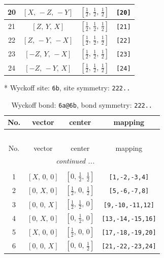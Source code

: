 \documentclass[fleqn,8pt]{jsarticle}
\begin{document}
\begin{longtable}{cccc}
20 & $\left[ X,\, - Z,\, - Y \right]$ & $\left[ \frac{1}{2},\, \frac{1}{2},\, \frac{1}{2} \right]$ & {\tt [20]} \\ \hline
21 & $\left[ Z,\, Y,\, X \right]$ & $\left[ \frac{1}{2},\, \frac{1}{2},\, \frac{1}{2} \right]$ & {\tt [21]} \\ \hline
22 & $\left[ Z,\, - Y,\, - X \right]$ & $\left[ \frac{1}{2},\, \frac{1}{2},\, \frac{1}{2} \right]$ & {\tt [22]} \\ \hline
23 & $\left[ - Z,\, Y,\, - X \right]$ & $\left[ \frac{1}{2},\, \frac{1}{2},\, \frac{1}{2} \right]$ & {\tt [23]} \\ \hline
24 & $\left[ - Z,\, - Y,\, X \right]$ & $\left[ \frac{1}{2},\, \frac{1}{2},\, \frac{1}{2} \right]$ & {\tt [24]} \\
\end{longtable}
* Wyckoff site: {\tt 6b}, site symmetry: {\tt 222..}
\renewcommand{\arraystretch}{1.2}
\begin{longtable}{cccc}
\caption{Wyckoff bond: {\tt 6a@6b}, bond symmetry: {\tt 222..}}
 \\
 \hline \hline
No. & vector & center & mapping \\ \hline \endfirsthead

\multicolumn{3}{l}{\tablename\ \thetable{}} \\
 \hline \hline
No. & vector & center & mapping \\ \hline \endhead

 \hline \hline
\multicolumn{3}{r}{\footnotesize\it continued ...} \\ \endfoot

 \hline \hline
\multicolumn{3}{r}{} \\ \endlastfoot

1 & $\left[ X,\, 0,\, 0 \right]$ & $\left[ 0,\, \frac{1}{2},\, \frac{1}{2} \right]$ & {\tt [1,-2,-3,4]} \\ \hline
2 & $\left[ 0,\, X,\, 0 \right]$ & $\left[ \frac{1}{2},\, 0,\, \frac{1}{2} \right]$ & {\tt [5,-6,-7,8]} \\ \hline
3 & $\left[ 0,\, 0,\, X \right]$ & $\left[ \frac{1}{2},\, \frac{1}{2},\, 0 \right]$ & {\tt [9,-10,-11,12]} \\ \hline
4 & $\left[ 0,\, X,\, 0 \right]$ & $\left[ 0,\, \frac{1}{2},\, 0 \right]$ & {\tt [13,-14,-15,16]} \\ \hline
5 & $\left[ X,\, 0,\, 0 \right]$ & $\left[ \frac{1}{2},\, 0,\, 0 \right]$ & {\tt [17,-18,-19,20]} \\ \hline
6 & $\left[ 0,\, 0,\, X \right]$ & $\left[ 0,\, 0,\, \frac{1}{2} \right]$ & {\tt [21,-22,-23,24]} \\
\end{longtable}
\end{document}
